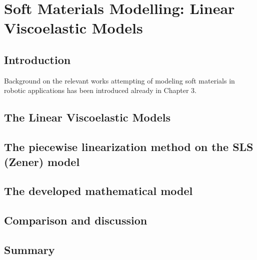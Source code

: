 \chapter{Soft Materials Modelling: Linear Viscoelastic Models} \label{sec:ModellingLVM}



\section{Introduction}

Background on the relevant works attempting of modeling soft materials in robotic applications has been introduced already in Chapter 3.

\section{The Linear Viscoelastic Models}

\section{The piecewise linearization method on the SLS (Zener) model}

\section{The developed mathematical model}

\section{Comparison and discussion}

\section{Summary}
